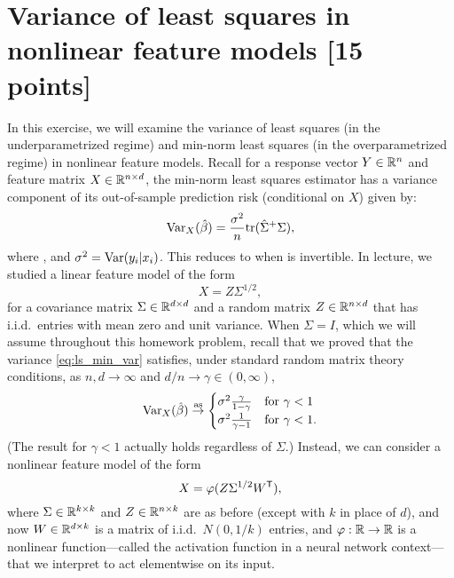 \documentclass{article}
\begin{document}
\section{Variance of least squares in nonlinear feature models [15 points]} 

\def\asto{\overset{\mathrm{as}}{\to}}
\def\hSigma{\hat\Sigma}

In this exercise, we will examine the variance of least squares (in the
underparametrized regime) and min-norm least squares (in the overparametrized 
regime) in nonlinear feature models. Recall for a response vector $Y \in \mathbb{R}^n$
and feature matrix $X \in \mathbb{R}^{n \times d}$, the min-norm least squares estimator 
 has a variance component of its
out-of-sample prediction risk (conditional on $X$) given by:
\begin{equation}
\label{eq:ls_min_var}
\Var_X(\hbeta) = \frac{\sigma^2}{n} \tr (\hSigma^+ \Sigma),
\end{equation}
where \smash{$\hSigma = X^\T X/n$}, and $\sigma^2 = \mathrm{Var}(y_i | x_i)$. This
reduces to \smash{$\Var_X(\hbeta) = \frac{\sigma^2}{n} \tr (\hSigma^{-1}
  \Sigma)$} when \smash{$\hSigma$} is invertible. In lecture, we studied a
linear feature model of the form  
\begin{equation}
\label{eq:linear_features}
X = Z \Sigma^{1/2},
\end{equation}
for a covariance matrix $\Sigma \in \mathbb{R}^{d \times d}$ and a random matrix $Z \in
\mathbb{R}^{n \times d}$ that has i.i.d.\ entries with mean zero and unit variance. When
$\Sigma = I$, which we will assume throughout this homework problem, recall that
we proved that the variance \eqref{eq:ls_min_var} satisfies, under standard
random matrix theory conditions, as $n,d \to \infty$ and $d/n \to \gamma \in 
(0,\infty)$, 
\begin{equation}
\label{eq:ls_min_var_iso_limit}
\Var_X(\hbeta) \asto 
\begin{cases}
\sigma^2 \frac{\gamma}{1-\gamma} & \text{for $\gamma < 1$} \\ 
\sigma^2 \frac{1}{\gamma-1} & \text{for $\gamma < 1$}.
\end{cases}
\end{equation}
(The result for $\gamma < 1$ actually holds regardless of $\Sigma$.) Instead, we
can consider a nonlinear feature model of the form 
\begin{equation}
\label{eq:nonlinear_features}
X = \varphi(Z \Sigma^{1/2} W^{\mathsf{T}}),
\end{equation}
where $\Sigma \in \mathbb{R}^{k \times k}$ and $Z \in \mathbb{R}^{n \times k}$ are as before
(except with $k$ in place of $d$), and now $W \in \mathbb{R}^{d \times k}$ is a matrix
of i.i.d.\ $N(0,1/k)$ entries, and $\varphi : \mathbb{R} \to \mathbb{R}$ is a nonlinear
function---called the activation function in a neural network context---that we
interpret to act elementwise on its input.
\end{document}
